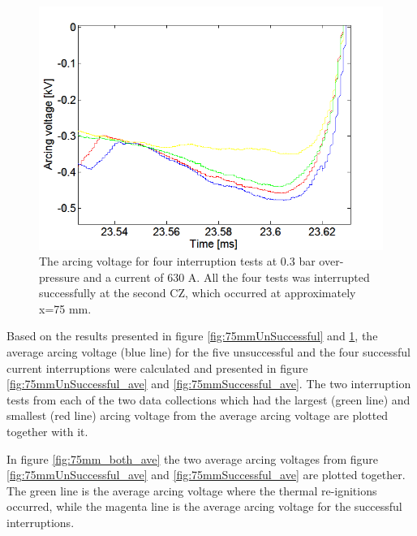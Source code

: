 \documentclass[10pt,b5paper,twoside]{article}
\begin{document}
\begin{figure}[H]
\centering
\includegraphics[scale=0.6, angle =0 ]{Bilder/Results/ArcingVoltage_75_none_reIgnition.PNG}
\caption{The arcing voltage for four interruption tests at 0.3 bar over-pressure and a current of 630 A. All the four tests was interrupted successfully at the second CZ, which occurred at approximately  x=75 mm.} \label{fig:75mmSuccessful}
\end{figure}

Based on the results presented in figure \ref{fig:75mmUnSuccessful} and \ref{fig:75mmSuccessful}, the average arcing voltage (blue line) for the five unsuccessful and the four successful current interruptions were calculated and presented in figure \ref{fig:75mmUnSuccessful_ave} and \ref{fig:75mmSuccessful_ave}. The two interruption tests from each of the two data collections which had the largest (green line) and smallest (red line) arcing voltage from the average arcing voltage are plotted together with it.

In figure \ref{fig:75mm_both_ave} the two average arcing voltages from figure \ref{fig:75mmUnSuccessful_ave} and \ref{fig:75mmSuccessful_ave} are plotted together. The green line is the average arcing voltage where the thermal re-ignitions occurred, while the magenta line is the average arcing voltage for the successful interruptions.
\end{document}
